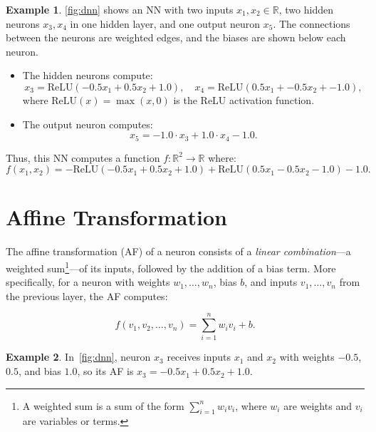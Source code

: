 \documentclass[oneside,11pt,dvipsnames]{book}
\numberwithin{equation}{section}
\theoremstyle{definition}
\newtheorem{example}{Example}[section]
\theoremstyle{remark}
\newcommand{\relu}[1]{\mathrm{ReLU}\left(#1\right)}
\begin{document}
\begin{example}\label{ex:dnn}
\autoref{fig:dnn} shows an NN with two inputs $x_1, x_2 \in \mathbb{R}$, two hidden neurons \(x_3, x_4\) in one hidden layer, and one output neuron \(x_5\). The connections between the neurons are weighted edges, and the biases are shown below each neuron.


\begin{itemize}
    \item The hidden neurons compute:
    \[
    x_3 = \relu{-0.5 x_1 + 0.5 x_2 + 1.0},\quad x_4 = \relu{0.5 x_1 + -0.5 x_2 + -1.0},
    \]
    where $\relu{x} = \max(x, 0)$ is the ReLU activation function.
    \item The output neuron computes:
    \[
    x_5 = -1.0 \cdot x_3 + 1.0 \cdot x_4 - 1.0.
    \]
\end{itemize}

Thus, this NN computes a function \(f: \mathbb{R}^2 \to \mathbb{R}\) where:
\[
f(x_1, x_2) = -\relu{-0.5 x_1 + 0.5 x_2 + 1.0} + \relu{0.5x_1 -0.5 x_2 - 1.0} - 1.0.
\]
\end{example}


\section{Affine Transformation}\label{sec:affine}

The affine transformation (AF) of a neuron consists of a \emph{linear combination}---a weighted sum\footnote{A weighted sum is a sum of the form \( \sum_{i=1}^{n} w_i v_i \), where \(w_i\) are weights and \(v_i\) are variables or terms.}---of its inputs, followed by the addition of a bias term. More specifically, for a neuron with weights \(w_1, \dots, w_n\), bias \(b\), and inputs \(v_1, \dots, v_n\) from the previous layer, the AF computes:

\begin{equation}\label{eq:affine}   
    f(v_1, v_2, \dots,v_n) = \sum_{i=1}^{n} w_i v_i + b.
\end{equation}


\begin{example}
In~\autoref{fig:dnn}, neuron \(x_3\) receives inputs \(x_1\) and \(x_2\) with weights \(-0.5\), \(0.5\), and bias \(1.0\), so its AF is $x_3 = -0.5 x_1 + 0.5 x_2 + 1.0$.
\end{example}


\end{document}
